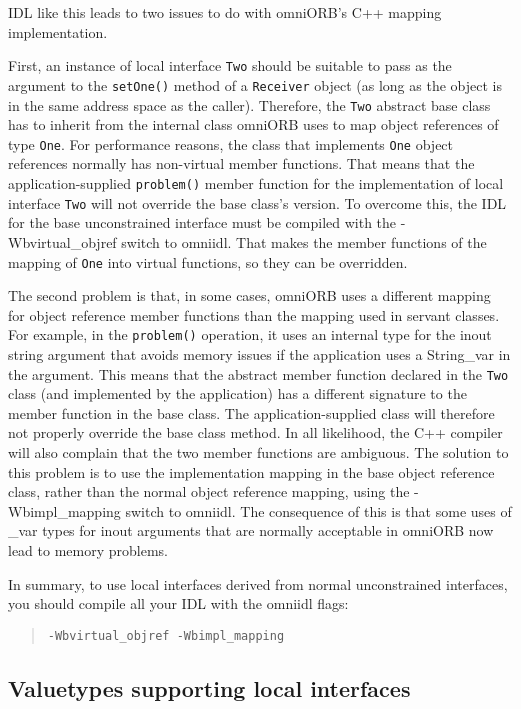 \documentclass[11pt,twoside,a4paper]{book}
\newcommand{\type}[1]{\texttt{#1}}
\newcommand{\op}[1]{\texttt{#1()}}
\newcommand{\cmdline}[1]{\texttt{#1}}
\begin{document}
IDL like this leads to two issues to do with omniORB's C++ mapping
implementation.

First, an instance of local interface \type{Two} should be suitable to
pass as the argument to the \op{setOne} method of a \type{Receiver}
object (as long as the object is in the same address space as the
caller). Therefore, the \type{Two} abstract base class has to inherit
from the internal class omniORB uses to map object references of type
\type{One}. For performance reasons, the class that implements
\type{One} object references normally has non-virtual member
functions. That means that the application-supplied \op{problem}
member function for the implementation of local interface \type{Two}
will not override the base class's version. To overcome this, the IDL
for the base unconstrained interface must be compiled with the
-Wbvirtual\_objref switch to omniidl. That makes the member functions
of the mapping of \type{One} into virtual functions, so they can be
overridden.

The second problem is that, in some cases, omniORB uses a different
mapping for object reference member functions than the mapping used in
servant classes. For example, in the \op{problem} operation, it uses
an internal type for the inout string argument that avoids memory
issues if the application uses a String\_var in the argument. This
means that the abstract member function declared in the \type{Two}
class (and implemented by the application) has a different signature
to the member function in the base class. The application-supplied
class will therefore not properly override the base class method. In
all likelihood, the C++ compiler will also complain that the two
member functions are ambiguous. The solution to this problem is to use
the implementation mapping in the base object reference class, rather
than the normal object reference mapping, using the -Wbimpl\_mapping
switch to omniidl. The consequence of this is that some uses of \_var
types for inout arguments that are normally acceptable in omniORB now
lead to memory problems.

In summary, to use local interfaces derived from normal unconstrained
interfaces, you should compile all your IDL with the omniidl flags:

\begin{quote}
\cmdline{-Wbvirtual\_objref -Wbimpl\_mapping}
\end{quote}


\subsection{Valuetypes supporting local interfaces}
\end{document}
